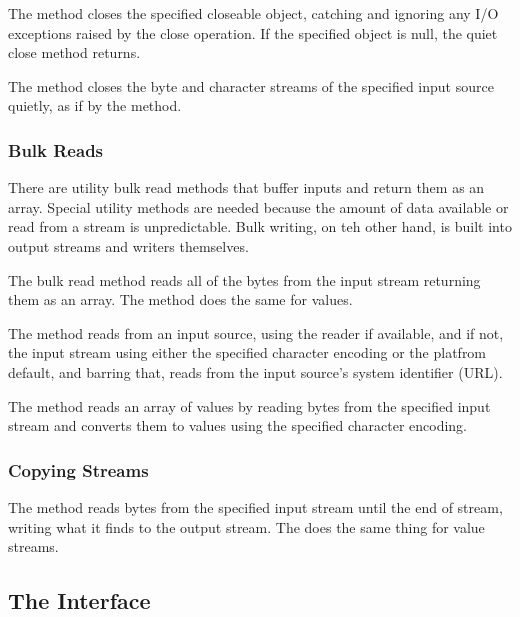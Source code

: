 The method  closes the specified
closeable object, catching and ignoring any I/O exceptions raised
by the close operation.  If the specified object is null, the
quiet close method returns.

The method  closes the byte
and character streams of the specified input source quietly, as
if by the  method.

\subsubsection{Bulk Reads}

There are utility bulk read methods that buffer inputs and return them
as an array.  Special utility methods are needed because the amount of
data available or read from a stream is unpredictable.  Bulk writing,
on teh other hand, is built into output streams and writers
themselves.

The bulk read method  reads all of the
bytes from the input stream returning them as an array.  The method
 does the same for  values.

The method  reads from an input source,
using the reader if available, and if not, the input stream using
either the specified character encoding or the platfrom default, and
barring that, reads from the input source's system identifier (URL).

The method  reads an array of
 values by reading bytes from the specified input stream
and converts them to  values using the specified character
encoding. 

\subsubsection{Copying Streams}

The method  reads bytes from the
specified input stream until the end of stream, writing what it finds
to the output stream.  The  does the same
thing for  value streams.

\subsection{The  Interface}\label{section:io-compilable}

